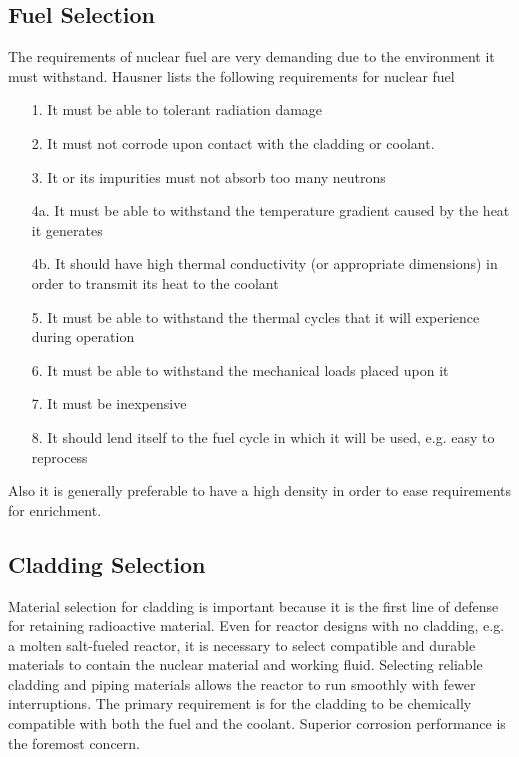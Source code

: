 
\subsection{Fuel Selection}
The requirements of nuclear fuel are very demanding due to the environment it must withstand. Hausner %
lists the following requirements for nuclear fuel
\begin{itemize}
\item[1.] It must be able to tolerant radiation damage
\item[2.] It must not corrode upon contact with the cladding or coolant.
\item[3.] It or its impurities must not absorb too many neutrons
\item[4a.] It must be able to withstand the temperature gradient caused by the heat it generates
\item[4b.] It should have high thermal conductivity (or appropriate dimensions) in order to transmit its heat to the coolant
\item[5.] It must be able to withstand the thermal cycles that it will experience during operation
\item[6.] It must be able to withstand the mechanical loads placed upon it
\item[7.] It must be inexpensive
\item[8.] It should lend itself to the fuel cycle in which it will be used, e.g. easy to reprocess
\end{itemize} 

Also it is generally preferable to have a high density in order to ease requirements for enrichment.

\subsection{Cladding Selection}
Material selection for cladding is important because it is the first line of defense for retaining radioactive material.
Even for reactor designs with no cladding, e.g. a molten salt-fueled reactor, it is necessary to select compatible and durable materials to contain the nuclear material and working fluid.
Selecting reliable cladding and piping materials allows the reactor to run smoothly with fewer interruptions. The primary requirement is for the cladding to be chemically compatible with both the fuel and the coolant. Superior corrosion performance is the foremost concern.

